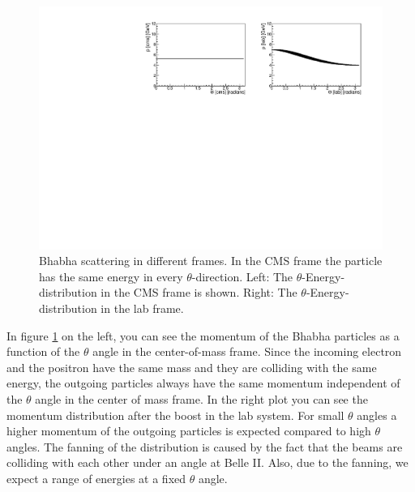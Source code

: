 \documentclass[a4paper,11pt,twosided,final,german,openbib,pdftex,listof=totoc,bibliography=totoc]{scrbook}
\begin{document}
\begin{figure}[h!]
	\centering
\includegraphics[width=\textwidth]{Bilder/CThetaP}
	\caption[$\theta$-Momentum-Distribution In The CMS And LAB Frame]{Bhabha scattering in different frames. In the CMS frame the particle has the same energy in every $\theta$-direction. Left: The $\theta$-Energy-distribution in the CMS frame is shown. Right: The $\theta$-Energy-distribution in the lab frame.}
	\label{fig:Belle IIMomentum}
	
\end{figure}

In figure \ref{fig:Belle IIMomentum} on the left, you can see  the momentum of the Bhabha particles as a function of the $\theta$ angle in the center-of-mass frame. Since the incoming electron and the positron have the same mass and they are colliding with the same energy, the outgoing particles always have the same momentum independent of the $\theta$ angle in the center of mass frame. In the right plot you can see the momentum distribution after the boost in the lab system. For small $\theta$ angles a higher momentum of the outgoing particles is expected compared to high $\theta$ angles. The fanning of the distribution is caused by the fact that the beams are colliding with each other under an angle at Belle II. Also, due to the fanning, we expect a range of energies at a fixed $\theta$ angle.
\end{document}
